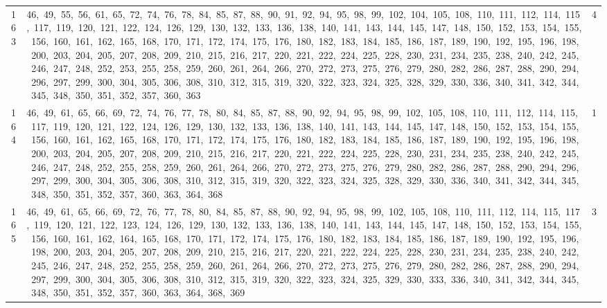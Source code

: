 \begin{longtable}{c|p{}|r}
163 & 46,\ 49,\ 55,\ 56,\ 61,\ 65,\ 72,\ 74,\ 76,\ 78,\ 84,\ 85,\ 87,\ 88,\ 90,\ 91,\ 92,\ 94,\ 95,\ 98,\ 99,\ 102,\ 104,\ 105,\ 108,\ 110,\ 111,\ 112,\ 114,\ 115,\ 117,\ 119,\ 120,\ 121,\ 122,\ 124,\ 126,\ 129,\ 130,\ 132,\ 133,\ 136,\ 138,\ 140,\ 141,\ 143,\ 144,\ 145,\ 147,\ 148,\ 150,\ 152,\ 153,\ 154,\ 155,\ 156,\ 160,\ 161,\ 162,\ 165,\ 168,\ 170,\ 171,\ 172,\ 174,\ 175,\ 176,\ 180,\ 182,\ 183,\ 184,\ 185,\ 186,\ 187,\ 189,\ 190,\ 192,\ 195,\ 196,\ 198,\ 200,\ 203,\ 204,\ 205,\ 207,\ 208,\ 209,\ 210,\ 215,\ 216,\ 217,\ 220,\ 221,\ 222,\ 224,\ 225,\ 228,\ 230,\ 231,\ 234,\ 235,\ 238,\ 240,\ 242,\ 245,\ 246,\ 247,\ 248,\ 252,\ 253,\ 255,\ 258,\ 259,\ 260,\ 261,\ 264,\ 266,\ 270,\ 272,\ 273,\ 275,\ 276,\ 279,\ 280,\ 282,\ 286,\ 287,\ 288,\ 290,\ 294,\ 296,\ 297,\ 299,\ 300,\ 304,\ 305,\ 306,\ 308,\ 310,\ 312,\ 315,\ 319,\ 320,\ 322,\ 323,\ 324,\ 325,\ 328,\ 329,\ 330,\ 336,\ 340,\ 341,\ 342,\ 344,\ 345,\ 348,\ 350,\ 351,\ 352,\ 357,\ 360,\ 363 & 4 \\
164 & 46,\ 49,\ 61,\ 65,\ 66,\ 69,\ 72,\ 74,\ 76,\ 77,\ 78,\ 80,\ 84,\ 85,\ 87,\ 88,\ 90,\ 92,\ 94,\ 95,\ 98,\ 99,\ 102,\ 105,\ 108,\ 110,\ 111,\ 112,\ 114,\ 115,\ 117,\ 119,\ 120,\ 121,\ 122,\ 124,\ 126,\ 129,\ 130,\ 132,\ 133,\ 136,\ 138,\ 140,\ 141,\ 143,\ 144,\ 145,\ 147,\ 148,\ 150,\ 152,\ 153,\ 154,\ 155,\ 156,\ 160,\ 161,\ 162,\ 165,\ 168,\ 170,\ 171,\ 172,\ 174,\ 175,\ 176,\ 180,\ 182,\ 183,\ 184,\ 185,\ 186,\ 187,\ 189,\ 190,\ 192,\ 195,\ 196,\ 198,\ 200,\ 203,\ 204,\ 205,\ 207,\ 208,\ 209,\ 210,\ 215,\ 216,\ 217,\ 220,\ 221,\ 222,\ 224,\ 225,\ 228,\ 230,\ 231,\ 234,\ 235,\ 238,\ 240,\ 242,\ 245,\ 246,\ 247,\ 248,\ 252,\ 255,\ 258,\ 259,\ 260,\ 261,\ 264,\ 266,\ 270,\ 272,\ 273,\ 275,\ 276,\ 279,\ 280,\ 282,\ 286,\ 287,\ 288,\ 290,\ 294,\ 296,\ 297,\ 299,\ 300,\ 304,\ 305,\ 306,\ 308,\ 310,\ 312,\ 315,\ 319,\ 320,\ 322,\ 323,\ 324,\ 325,\ 328,\ 329,\ 330,\ 336,\ 340,\ 341,\ 342,\ 344,\ 345,\ 348,\ 350,\ 351,\ 352,\ 357,\ 360,\ 363,\ 364,\ 368 & 1 \\
165 & 46,\ 49,\ 61,\ 65,\ 66,\ 69,\ 72,\ 76,\ 77,\ 78,\ 80,\ 84,\ 85,\ 87,\ 88,\ 90,\ 92,\ 94,\ 95,\ 98,\ 99,\ 102,\ 105,\ 108,\ 110,\ 111,\ 112,\ 114,\ 115,\ 117,\ 119,\ 120,\ 121,\ 122,\ 123,\ 124,\ 126,\ 129,\ 130,\ 132,\ 133,\ 136,\ 138,\ 140,\ 141,\ 143,\ 144,\ 145,\ 147,\ 148,\ 150,\ 152,\ 153,\ 154,\ 155,\ 156,\ 160,\ 161,\ 162,\ 164,\ 165,\ 168,\ 170,\ 171,\ 172,\ 174,\ 175,\ 176,\ 180,\ 182,\ 183,\ 184,\ 185,\ 186,\ 187,\ 189,\ 190,\ 192,\ 195,\ 196,\ 198,\ 200,\ 203,\ 204,\ 205,\ 207,\ 208,\ 209,\ 210,\ 215,\ 216,\ 217,\ 220,\ 221,\ 222,\ 224,\ 225,\ 228,\ 230,\ 231,\ 234,\ 235,\ 238,\ 240,\ 242,\ 245,\ 246,\ 247,\ 248,\ 252,\ 255,\ 258,\ 259,\ 260,\ 261,\ 264,\ 266,\ 270,\ 272,\ 273,\ 275,\ 276,\ 279,\ 280,\ 282,\ 286,\ 287,\ 288,\ 290,\ 294,\ 297,\ 299,\ 300,\ 304,\ 305,\ 306,\ 308,\ 310,\ 312,\ 315,\ 319,\ 320,\ 322,\ 323,\ 324,\ 325,\ 329,\ 330,\ 333,\ 336,\ 340,\ 341,\ 342,\ 344,\ 345,\ 348,\ 350,\ 351,\ 352,\ 357,\ 360,\ 363,\ 364,\ 368,\ 369 & 3 \\

\end{longtable}
